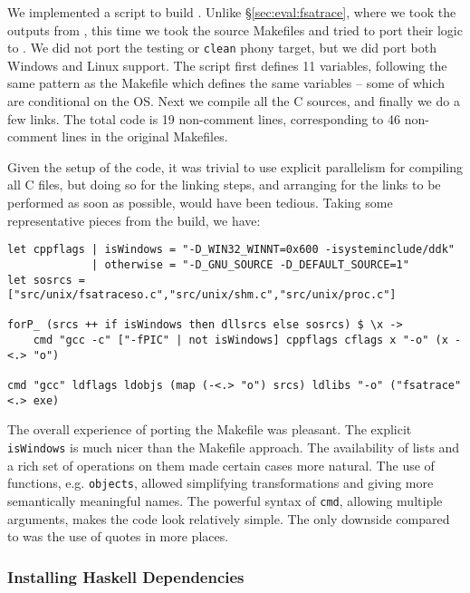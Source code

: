 We implemented a \Rattle script to build \Fsatrace. Unlike \S\ref{sec:eval:fsatrace}, where we took the outputs from \Make, this time we took the source Makefiles and tried to port their logic to \Rattle. We did not port the testing or \texttt{clean} phony target, but we did port both Windows and Linux support. The script first defines 11 variables, following the same pattern as the Makefile which defines the same variables -- some of which are conditional on the OS. Next we compile all the C sources, and finally we do a few links. The total code is 19 non-comment lines, corresponding to 46 non-comment lines in the original Makefiles.

Given the setup of the code, it was trivial to use explicit parallelism for compiling all C files, but doing so for the linking steps, and arranging for the links to be performed as soon as possible, would have been tedious. Taking some representative pieces from the build, we have:

\begin{small}
\begin{verbatim}
let cppflags | isWindows = "-D_WIN32_WINNT=0x600 -isysteminclude/ddk"
             | otherwise = "-D_GNU_SOURCE -D_DEFAULT_SOURCE=1"
let sosrcs = ["src/unix/fsatraceso.c","src/unix/shm.c","src/unix/proc.c"]

forP_ (srcs ++ if isWindows then dllsrcs else sosrcs) $ \x ->
    cmd "gcc -c" ["-fPIC" | not isWindows] cppflags cflags x "-o" (x -<.> "o")

cmd "gcc" ldflags ldobjs (map (-<.> "o") srcs) ldlibs "-o" ("fsatrace" <.> exe)
\end{verbatim}
\end{small}

The overall experience of porting the Makefile was pleasant. The explicit \texttt{isWindows} is much nicer than the Makefile approach. The  availability of lists and a rich set of operations on them made certain cases more natural. The use of functions, e.g. \texttt{objects}, allowed simplifying transformations and giving more semantically meaningful names. The powerful syntax of \texttt{cmd}, allowing multiple arguments, makes the code look relatively simple. The only downside compared to \Make was the use of quotes in more places.

\subsubsection{Installing Haskell Dependencies}

